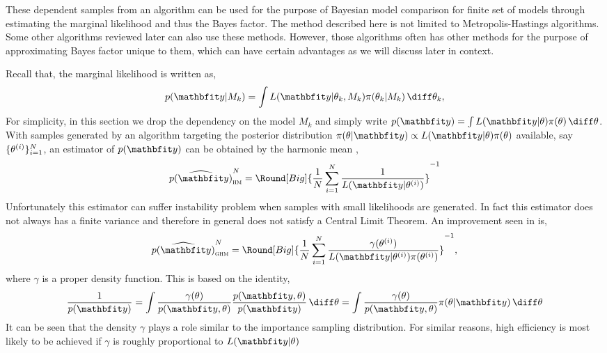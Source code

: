 These dependent samples from an \mcmc algorithm can be used for the purpose of
Bayesian model comparison for finite set of models through estimating the
marginal likelihood and thus the Bayes factor. The method described here is
not limited to Metropolis-Hastings algorithms. Some other algorithms reviewed
later can also use these methods. However, those algorithms often has other
methods for the purpose of approximating Bayes factor unique to them, which
can have certain advantages as we will discuss later in context.

Recall that, the marginal likelihood is written as,
\begin{equation*}
  p(\data|M_k) = \int L(\data|\theta_k,M_k)\pi(\theta_k|M_k)\intd\theta_k,
\end{equation*}
For simplicity, in this section we drop the dependency on the model $M_k$ and
simply write $p(\data) = \int L(\data|\theta)\pi(\theta)\intd\theta$.  With
samples generated by an \mcmc algorithm targeting the posterior distribution
$\pi(\theta|\data) \propto L(\data|\theta) \pi(\theta)$ available, say
$\{\theta^{(i)}\}_{i=1}^N$, an estimator of $p(\data)$ can be obtained by the
harmonic mean \cite{Newton:1994wm},
\begin{equation}
  \widehat{p(\data)}_{\text{\textsc{hm}}}^N =
  \Round[Big]{\frac{1}{N}\sum_{i=1}^N\frac{1}{L(\data|\supi\theta)}}^{-1}
\end{equation}
Unfortunately this estimator can suffer instability problem when samples with
small likelihoods are generated. In fact this estimator does not always has a
finite variance and therefore in general does not satisfy a Central Limit
Theorem. An improvement seen in \cite{Kass:1995vb} is,
\begin{equation}
  \widehat{p(\data)}_{\text{\textsc{ghm}}}^N = \Round[Big]{
    \frac{1}{N}\sum_{i=1}^N
    \frac{\gamma(\supi\theta)}{L(\data|\supi\theta)\pi(\supi\theta)}}^{-1},
\end{equation}
where $\gamma$ is a proper density function. This is based on the identity,
\begin{equation}
  \frac{1}{p(\data)}
  = \int \frac{\gamma(\theta)}{p(\data,\theta)}
  \frac{p(\data,\theta)}{p(\data)} \intd \theta
  = \int \frac{\gamma(\theta)}{p(\data,\theta)} \pi(\theta|\data) \intd \theta
\end{equation}
It can be seen that the density $\gamma$ plays a role similar to the
importance sampling distribution. For similar reasons, high efficiency is most
likely to be achieved if $\gamma$ is roughly proportional to $L(\data|\theta)$
